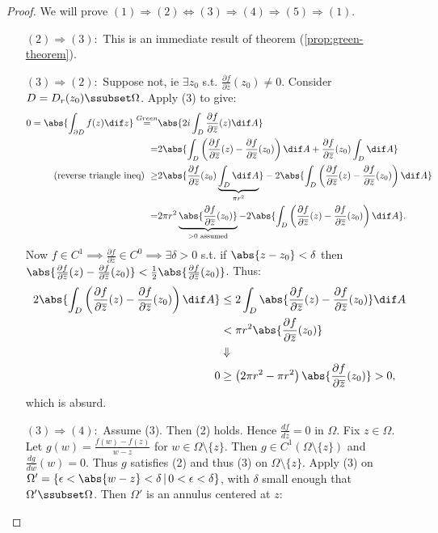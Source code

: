 \begin{proof}
We will prove $(1) \Rightarrow (2) \Leftrightarrow (3) \Rightarrow (4) \Rightarrow (5) \Rightarrow (1)$.

\begin{enumerate}
    \item[$(2)\Rightarrow (3):$] This is an immediate result of theorem (\ref{prop:green-theorem}).
    \item[$(3)\Rightarrow (2):$] Suppose not, ie $\exists z_0$ s.t. $\frac{\partial f}{\partial \overline{z}} (z_0) \neq 0$. Consider $D= D_r(z_0)\ssubset \Omega$. Apply (3) to give:
    \begin{align*}
        0 = \abs{\int_{\partial D} f(z)  \dif z} \overset{Green}{=}& \abs{2i \int_D \frac{\partial f}{\partial \overline{z}}(z)  \dif A}\\
        =& 2\abs{\int_D  \left( \frac{\partial f}{\partial \overline{z}}(z) - \frac{\partial f}{\partial \overline{z}}(z_0) \right)  \dif A + \frac{\partial f}{\partial \overline{z}}(z_0) \int_D \dif A }\\
        \text{(reverse triangle ineq) } \geq&  2\abs{\frac{\partial f}{\partial \overline{z}}(z_0) \underbrace{\int_D \dif A}_{\pi r^2}}  -  2 \abs{\int_D \left( \frac{\partial f}{\partial \overline{z}}(z) - \frac{\partial f}{\partial \overline{z}}(z_0) \right)  \dif A}\\
        =& 2\pi r^2 \underbrace{\abs{\frac{\partial f}{\partial \overline{z}}(z_0)}}_{>0 \text{ assumed}} - 2 \abs{\int_D \left( \frac{\partial f}{\partial \overline{z}}(z) - \frac{\partial f}{\partial \overline{z}}(z_0) \right)  \dif A}.
    \end{align*}
    Now $f\in C^1 \implies  \frac{\partial  f }{ \partial \overline{z}} \in C^0 \implies \exists \delta>0$ s.t. if $\abs{z-z_0}< \delta$ then $\abs{ \frac{\partial f}{\partial \overline{z}}(z) - \frac{\partial f}{\partial \overline{z}}(z_0) }< \frac{1}{2}\abs{\frac{\partial f}{\partial \overline{z}}(z_0)}$. Thus:
    \begin{align*}
        2 \abs{\int_D \left( \frac{\partial f}{\partial \overline{z}}(z) - \frac{\partial f}{\partial \overline{z}}(z_0) \right)  \dif A} &\leq 2 \int_D \abs{ \frac{\partial f}{\partial \overline{z}}(z) - \frac{\partial f}{\partial \overline{z}}(z_0)}  \dif A\\
        &< \pi r^2 \abs{\frac{\partial f}{\partial \overline{z}}(z_0)}\\
        &\Downarrow\\
        0 &\geq \left( 2\pi r^2 - \pi r^2\right) \abs{\frac{\partial f}{\partial \overline{z}}(z_0)} > 0,
    \end{align*}
    which is absurd.
    \item[$(3) \Rightarrow (4):$] Assume (3). Then (2) holds. Hence $\frac{df}{d\overline{z}} = 0$ in $\Omega$. Fix $z\in\Omega$. Let $g(w) = \frac{f(w)-f(z)}{w-z}$ for $w\in\Omega \setminus \{z\}$. Then $g\in C^1(\Omega \setminus \{z\})$ and $\frac{dg}{d\overline{w}}(w) = 0$. Thus $g$ satisfies (2) and thus (3) on $\Omega \setminus \{z\}$. Apply (3) on $\Omega' = \{ \epsilon < \abs{w-z} < \delta \, | \, 0<\epsilon<\delta\}$, with $\delta$ small enough that $\Omega' \ssubset \Omega$. Then $\Omega'$ is an annulus centered at $z$:
    

\end{enumerate}
\end{proof}
